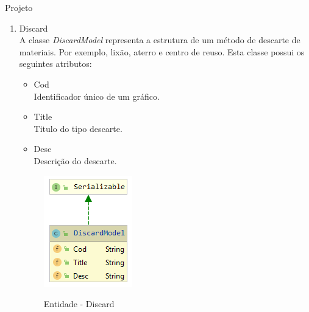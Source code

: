 \documentclass[
	12pt,				%
	openright,			%
	twoside,			%
	a4paper,			%
	english,			%
	french,				%
	spanish,			%
	brazil				%
	]{abntex2}
\begin{document}
\begin{chapter}{Projeto}
\begin{enumerate}
  \item{Discard}   \\ A classe \textit{DiscardModel} representa a estrutura de um método de descarte de materiais. Por exemplo, lixão, aterro e centro de reuso. Esta classe possui os seguintes atributos:
  
  \begin{itemize}
  \item{Cod}\\ Identificador único de um gráfico.
       \item{Title}\\Titulo do tipo descarte.
         \item{Desc}\\ Descrição do descarte.
  
    
\end{itemize}
  
\begin{figure}[h]
\centering
   \caption{Entidade - Discard}
   \includegraphics[scale=1.0]{media/discardModel.png}
     \label{fig:discardModel}
\end{figure}


\end{enumerate}
\end{chapter}
\end{document}
